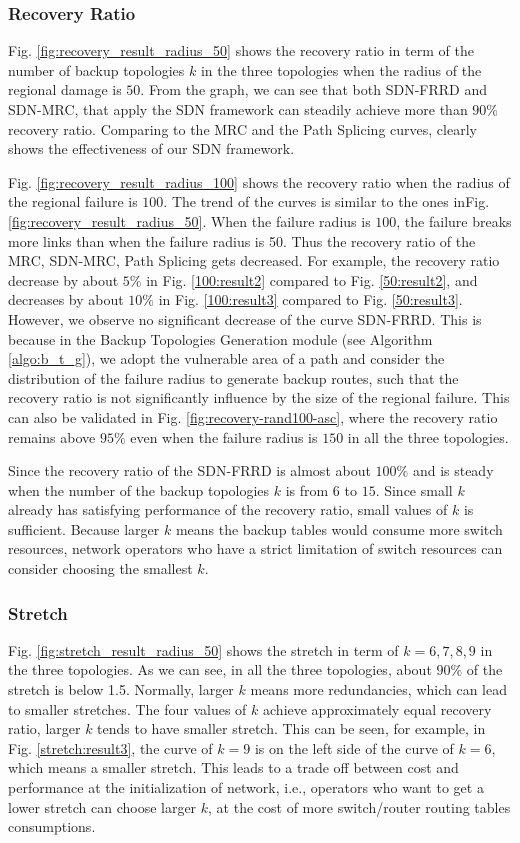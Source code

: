 \documentclass[10pt,journal]{IEEEtran}
\begin{document}
\subsubsection{Recovery Ratio}
Fig. \ref{fig:recovery_result_radius_50} shows the recovery ratio in term of the number of backup topologies $k$ in the three topologies when the radius of the regional damage is $50$. From the graph, we can see that both SDN-FRRD and SDN-MRC, that apply the SDN framework can steadily achieve more than $90\%$ recovery ratio. Comparing to the MRC and the Path Splicing curves, clearly shows the effectiveness of our SDN framework.

Fig. \ref{fig:recovery_result_radius_100} shows the recovery ratio when the radius of the regional failure is $100$. The trend of the curves is similar to the ones inFig. \ref{fig:recovery_result_radius_50}. When the failure radius is $100$, the failure breaks more links than when the failure radius is 50. Thus the recovery ratio of the MRC, SDN-MRC, Path Splicing gets decreased. For example, the recovery ratio decrease by about $5\%$ in Fig. \ref{100:result2} compared to Fig. \ref{50:result2}, and decreases by about $10\%$ in Fig. \ref{100:result3} compared to Fig. \ref{50:result3}. However, we observe no significant decrease of the curve SDN-FRRD. This is because in the Backup Topologies Generation module (see Algorithm \ref{algo:b_t_g}), we adopt the vulnerable area of a path and consider the distribution of the failure radius to generate backup routes, such that the recovery ratio is not significantly influence by the size of the regional failure. This can also be validated in Fig. \ref{fig:recovery-rand100-asc}, where the recovery ratio remains above $95\%$ even when the failure radius is $150$ in all the three topologies.

Since the recovery ratio of the SDN-FRRD is almost about $100\%$ and is steady when the number of the backup topologies $k$ is from $6$ to $15$. Since small $k$ already has satisfying performance of the recovery ratio, small values of $k$ is sufficient. Because larger $k$ means the backup tables would consume more switch resources, network operators who have a strict limitation of switch resources can consider choosing the smallest $k$.
\subsubsection{Stretch}
Fig. \ref{fig:stretch_result_radius_50} shows the stretch in term of $k=6, 7, 8, 9$ in the three topologies. As we can see, in all the three topologies, about $90\%$ of the stretch is below 1.5. Normally, larger $k$ means more redundancies, which can lead to smaller stretches. The four values of $k$ achieve approximately equal recovery ratio, larger $k$ tends to have smaller stretch. This can be seen, for example, in Fig. \ref{stretch:result3}, the curve of $k=9$ is on the left side of the curve of $k=6$, which means a smaller stretch. This leads to a trade off between cost and performance at the initialization of network, i.e., operators who want to get a lower stretch can choose larger $k$, at the cost of more switch/router routing tables consumptions.
\end{document}
